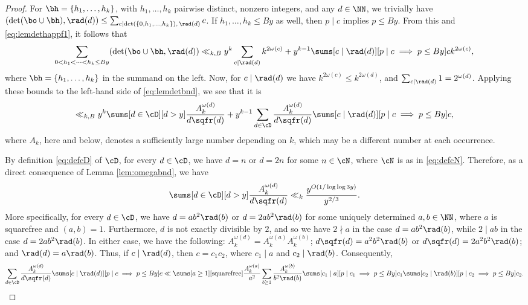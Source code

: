 \documentclass[12pt, reqno, twoside, letterpaper]{amsart}
\begin{document}
\begin{proof}
For $\bh = \{h_1,\ldots,h_k\}$, with $h_1,\ldots,h_k$ pairwise 
distinct, nonzero integers, and any $d \in \NN$, we trivially have 
$
 (\det(\bo \cup \bh),\rad(d)) 
   \le 
    \sum_{c \mid \det(\{0,h_1,\ldots,h_k\}), \, \rad(d)} c
$.
%
If $h_1,\ldots,h_k \le By$ as well, then $p \mid c$ implies 
$p \le By$.
%
From this and \eqref{eq:lemdethappf1}, it follows that 
\[
 \sum_{0 < h_1 < \cdots < h_k \le By} 
  (\det(\bo \cup \bh,\rad(d))
   \ll_{k,B}
    y^k
     \sum_{c \mid \rad(d)} k^{2\omega(c)}
      +
        y^{k - 1}
         \sums[c \mid \rad(d)][p \mid c \implies p \le By]
           ck^{2\omega(c)},
\]
where $\bh = \{h_1,\ldots,h_k\}$ in the summand on the left.
%
Now, for $c \mid \rad(d)$ we have 
$k^{2\omega(c)} \le k^{2\omega(d)}$, and 
$\sum_{c \mid \rad(d)} 1 = 2^{\omega(d)}$.
%
Applying these bounds to the left-hand side of 
\eqref{eq:lemdetbnd}, we see that it is 
\begin{equation}
 \label{eq:lemdetpf1}
      \ll_{k,B}
       y^k
        \sums[d \in \cD][d > y] 
         \frac{A_k^{\omega(d)}}{d\sqfr(d)}
        +
           y^{k - 1} 
            \sum_{d \in \cD}
             \frac{A_k^{\omega(d)}}{d\sqfr(d)}
              \sums[c \mid \rad(d)][p \mid c \implies p \le By] c, 
\end{equation}
where $A_k$, here and below, denotes a sufficiently large number 
depending on $k$, which may be a different number at each 
occurrence.

By definition \eqref{eq:defcD} of $\cD$, for every $d \in \cD$, we 
have $d = n$ or $d = 2n$ for some $n \in \cN$, where $\cN$ is 
as in \eqref{eq:defcN}. 
%
Therefore, as a direct consequence of Lemma \ref{lem:omegabnd}, we 
have 
\begin{equation}
 \label{eq:lemdetpf2}
 \sums[d \in \cD][d > y] 
  \frac{A_k^{\omega(d)}}{d\sqfr(d)}
   \ll_k 
    \frac{y^{O(1/\log\log 3y)}}{y^{2/3}}.
\end{equation}
%
More specifically, for every $d \in \cD$, we have 
$d = ab^2\rad(b)$ or $d = 2ab^2\rad(b)$ for some uniquely 
determined $a,b \in \NN$, where $a$ is squarefree and $(a,b) = 1$.
%
Furthermore, $d$ is not exactly divisible by $2$, and so we have 
$2 \nmid a$ in the case $d = ab^2\rad(b)$, while $2 \mid ab$ in 
the case $d = 2ab^2\rad(b)$.
%
In either case, we have the following:
$A_k^{\omega(d)} = A_k^{\omega(a)}A_k^{\omega(b)}$;  
$d\sqfr(d) = a^2b^2\rad(b)$ or 
$d\sqfr(d) = 2a^2b^2\rad(b)$; and $\rad(d) = a\rad(b)$.
%
Thus, if $c \mid \rad(d)$, then $c = c_1c_2$, where $c_1 \mid a$
and $c_2 \mid \rad(b)$.
%
Consequently,  
\[
 \sum_{d \in \cD}
  \frac{A_k^{\omega(d)}}{d\sqfr(d)}
   \sums[c \mid \rad(d)][p \mid c \implies p \le By] c
    \ll
     \sums[a \ge 1][\text{squarefree}] %
      \frac{A_k^{\omega(a)}}{a^2}
       \sum_{b \ge 1} \frac{A_k^{\omega(b)}}{b^2\rad(b)}
        \sums[c_1 \mid a][p \mid c_1 \implies p \le By] c_1
         \sums[c_2 \mid \rad(b)][p \mid c_2 \implies p \le By] c_2.
\]


\end{proof}
\end{document}
